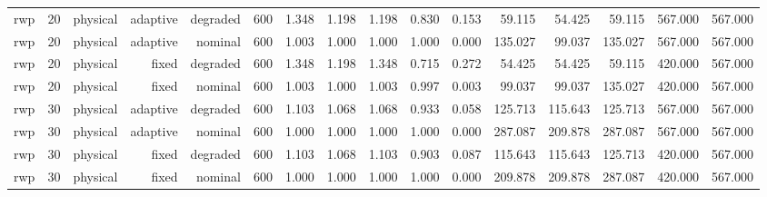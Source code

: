 \begin{tabular}{lrrrrrrrrrrrrrrr}
rwp & 20 & physical & adaptive & degraded & 600 & 1.348 & 1.198 & 1.198 & 0.830 & 0.153 & 59.115 & 54.425 & 59.115 & 567.000 & 567.000 \\
rwp & 20 & physical & adaptive & nominal & 600 & 1.003 & 1.000 & 1.000 & 1.000 & 0.000 & 135.027 & 99.037 & 135.027 & 567.000 & 567.000 \\
rwp & 20 & physical & fixed & degraded & 600 & 1.348 & 1.198 & 1.348 & 0.715 & 0.272 & 54.425 & 54.425 & 59.115 & 420.000 & 567.000 \\
rwp & 20 & physical & fixed & nominal & 600 & 1.003 & 1.000 & 1.003 & 0.997 & 0.003 & 99.037 & 99.037 & 135.027 & 420.000 & 567.000 \\
rwp & 30 & physical & adaptive & degraded & 600 & 1.103 & 1.068 & 1.068 & 0.933 & 0.058 & 125.713 & 115.643 & 125.713 & 567.000 & 567.000 \\
rwp & 30 & physical & adaptive & nominal & 600 & 1.000 & 1.000 & 1.000 & 1.000 & 0.000 & 287.087 & 209.878 & 287.087 & 567.000 & 567.000 \\
rwp & 30 & physical & fixed & degraded & 600 & 1.103 & 1.068 & 1.103 & 0.903 & 0.087 & 115.643 & 115.643 & 125.713 & 420.000 & 567.000 \\
rwp & 30 & physical & fixed & nominal & 600 & 1.000 & 1.000 & 1.000 & 1.000 & 0.000 & 209.878 & 209.878 & 287.087 & 420.000 & 567.000 \\
\bottomrule
\end{tabular}